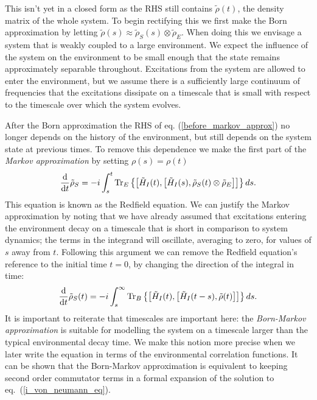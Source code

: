 This isn't yet in a closed form as the RHS still contains $\tilde{\rho}(t)$, the density matrix of the whole system. To begin rectifying this we first make the Born approximation by letting $\tilde{\rho}(s) \approx \tilde{\rho}_S(s) \otimes \tilde{\rho}_E$. When doing this we envisage a system that is weakly coupled to a large environment. We expect the influence of the system on the environment to be small enough that the state remains approximately separable throughout. Excitations from the system are allowed to enter the environment, but we assume there is a sufficiently large continuum of frequencies that the excitations dissipate on a timescale that is small with respect to the timescale over which the system evolves. 

After the Born approximation the RHS of eq. (\ref{before_markov_approx}) no longer depends on the history of the environment, but still depends on the system state at previous times. To remove this dependence we make the first part of the \textit{Markov approximation} by setting $\rho(s) = \rho(t)$
\begin{align}
  \frac{\mathrm{d}}{\mathrm{d}t} \tilde{\rho}_S = -i \int_{s}^t \operatorname{Tr}_E\left\{\left[ \tilde{H}_I(t), \left[ \tilde{H}_I(s), \tilde{\rho}_S(t)\otimes\tilde{\rho}_E \right] \right]\right\} ds.
\end{align}
This equation is known as the Redfield equation. We can justify the Markov approximation by noting that we have already assumed that excitations entering the environment decay on a timescale that is short in comparison to system dynamics; the terms in the integrand will oscillate, averaging to zero, for values of $s$ away from $t$. Following this argument we can remove the Redfield equation's reference to the initial time $t=0$, by changing the direction of the integral in time:
\begin{align}
  \label{redfield_eq}
  \frac{\mathrm{d}}{\mathrm{d}t} \tilde{\rho}_S(t) = -i \int_{s}^\infty \operatorname{Tr}_B\left\{\left[ \tilde{H}_I(t), \left[ \tilde{H}_I(t-s), \tilde{\rho}(t) \right] \right]\right\} ds.
\end{align}
It is important to reiterate that timescales are important here: the \textit{Born-Markov approximation} is suitable for modelling the system on a timescale larger than the typical environmental decay time. We make this notion more precise when we later write the equation in terms of the environmental correlation functions. It can be shown \cite{kok+lovett} that the Born-Markov approximation is equivalent to keeping second order commutator terms in a formal expansion of the solution to eq.~(\ref{i_von_neumann_eq}).

